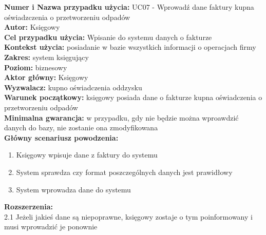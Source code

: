 \textbf{Numer i Nazwa przypadku użycia:} UC07 - Wprowadź dane faktury kupna oświadzczenia o przetworzeniu odpadów \\
\textbf{Autor:} Księgowy\\
\textbf{Cel przypadku użycia:} Wpisanie do systemu danych o fakturze \\
\textbf{Kontekst użycia:} posiadanie w bazie wszystkich informacji o operacjach firmy\\
\textbf{Zakres:} system księgujący \\
\textbf{Poziom:} biznesowy \\
\textbf{Aktor główny:} Księgowy \\
\textbf{Wyzwalacz:} kupno oświadczenia oddzysku \\
\textbf{Warunek początkowy:} księgowy posiada dane o fakturze kupna oświadczenia o przetworzeniu odpadów \\
\textbf{Minimalna gwarancja:} w przypadku, gdy nie będzie można wproawdzić danych do bazy, nie zostanie ona zmodyfikowana \\
\textbf{Główny scenariusz powodzenia:} 
	\begin{enumerate}
		\item Księgowy wpisuje dane z faktury do systemu
		\item System sprawdza czy format poszczególnych danych jest prawidłowy
		\item System wprowadza dane do systemu
	\end{enumerate}
\textbf{Rozszerzenia:} \\
2.1 Jeżeli jakieś dane są niepoprawne, księgowy zostaje o tym poinformowany i musi wprowadzić je ponownie

